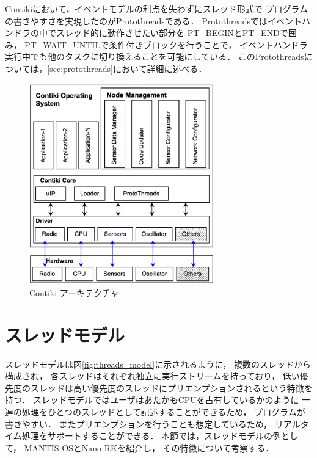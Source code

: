 Contikiにおいて，イベントモデルの利点を失わずにスレッド形式で
プログラムの書きやすさを実現したのがProtothreads\cite{Dunkels:2006:PSE:1182807.1182811}である．
Protothreadsではイベントハンドラの中でスレッド的に動作させたい部分を
PT\_BEGINとPT\_ENDで囲み，
PT\_WAIT\_UNTILで条件付きブロックを行うことで，
イベントハンドラ実行中でも他のタスクに切り換えることを可能にしている．
このProtothreadsについては，\ref{sec:protothreads}において詳細に述べる．


\begin{figure}[htbp]
 \begin{center}
  \includegraphics[width=80mm]{./images/system_conf_of_contiki.eps}
 \end{center}
 \caption{Contiki アーキテクチャ}
 \label{fig:system_conf_of_contiki}
\end{figure}




\section{スレッドモデル}\label{sec:threads_model}
スレッドモデルは図\ref{fig:threads_model}に示されるように，
複数のスレッドから構成され，
各スレッドはそれぞれ独立に実行ストリームを持っており，
低い優先度のスレッドは高い優先度のスレッドにプリエンプションされるという特徴を持つ．
スレッドモデルではユーザはあたかもCPUを占有しているかのように
一連の処理をひとつのスレッドとして記述することができるため，
プログラムが書きやすい．
またプリエンプションを行うことも想定しているため，
リアルタイム処理をサポートすることができる．
本節では，スレッドモデルの例として，
MANTIS OSとNano-RKを紹介し，
その特徴について考察する．



